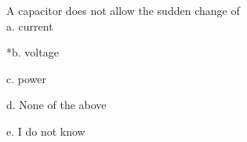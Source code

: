 
A capacitor does not allow the sudden change of\\

a. current

*b. voltage

c. power

d. None of the above

e. I do not know \\
